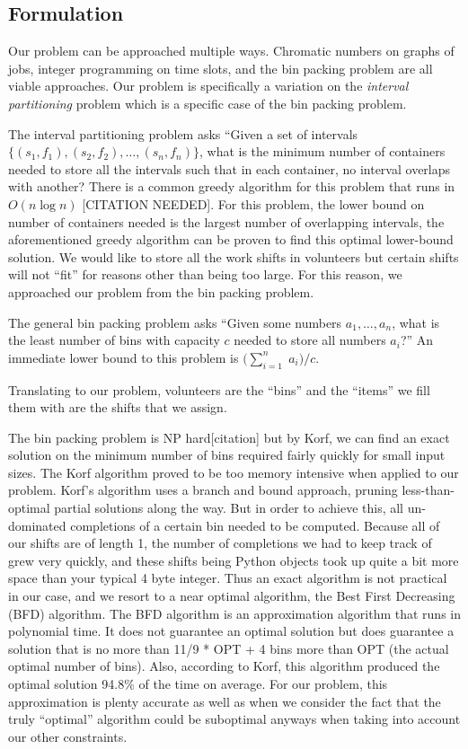 \documentclass[11pt]{article}
\theoremstyle{definition}
\begin{document}
\begin{multicols}{2}
\section{Formulation}
Our problem can be approached multiple ways.
Chromatic numbers on graphs of jobs, integer programming on time slots, and the bin packing problem are all viable approaches.
Our problem is specifically a variation on the \textit{interval partitioning} problem which is a specific case of the bin packing problem.

The interval partitioning problem asks ``Given a set of intervals $\{(s_1, f_1), (s_2, f_2), \ldots, (s_n, f_n)\}$, what is the minimum number of containers needed to store all the intervals such that in each container, no interval overlaps with another?
There is a common greedy algorithm for this problem that runs in $O(n\log n)$ [CITATION NEEDED].
For this problem, the lower bound on number of containers needed is the largest number of overlapping intervals, the aforementioned greedy algorithm can be proven to find this optimal lower-bound solution.
We would like to store all the work shifts in volunteers but certain shifts will not ``fit'' for reasons other than being too large.
For this reason, we approached our problem from the bin packing problem.

The general bin packing problem asks ``Given some numbers $a_1, \ldots, a_n$, what is the least number of bins with capacity $c$ needed to store all numbers $a_i$?''
An immediate lower bound to this problem is $\big(\sum_{i = 1}^{n}\;a_i\big)/c$.

Translating to our problem, volunteers are the ``bins'' and the ``items'' we fill them with are the shifts that we assign.

The bin packing problem is NP hard[citation] but by Korf, we can find an exact solution on the minimum number of bins required fairly quickly for small input sizes.
The Korf algorithm proved to be too memory intensive when applied to our problem.
Korf's algorithm uses a branch and bound approach, pruning less-than-optimal partial solutions along the way.
But in order to achieve this, all un-dominated completions of a certain bin needed to be computed.
Because all of our shifts are of length 1, the number of completions we had to keep track of grew very quickly, and these shifts being Python objects took up quite a bit more space than your typical 4 byte integer.
Thus an exact algorithm is not practical in our case, and we resort to a near optimal algorithm, the Best First Decreasing (BFD) algorithm.
The BFD algorithm is an approximation algorithm that runs in polynomial time. It does not guarantee an optimal solution but does guarantee a solution that is no more than 11/9 * OPT + 4 bins more than OPT (the actual optimal number of bins). Also, according to Korf, this algorithm produced the optimal solution 94.8\% of the time on average.
For our problem, this approximation is plenty accurate as well as when we consider the fact that the truly ``optimal'' algorithm could be suboptimal anyways when taking into account our other constraints.


\end{multicols}
\end{document}

